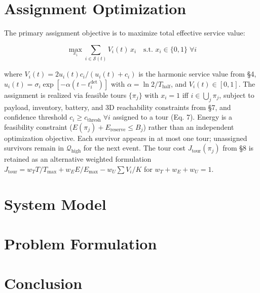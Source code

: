 \documentclass[conference]{IEEEtran}
\begin{document}
\section{Assignment Optimization}

The primary assignment objective is to maximize total effective service value:

\begin{equation}
\max_{x_i} \sum_{i\in\mathcal{S}(t)} V_i(t)\,x_i \quad \text{s.t. } x_i\in\{0,1\}\;\forall i
\end{equation}

where $V_i(t)=2u_i(t)c_i/(u_i(t)+c_i)$ is the harmonic service value from \S4, $u_i(t)=\sigma_i\exp[-\alpha(t-t_i^{\text{det}})]$ with $\alpha=\ln2/T_{\text{half}}$, and $V_i(t)\in[0,1]$. The assignment is realized via feasible tours $\{\pi_j\}$ with $x_i=1$ iff $i\in\bigcup_j\pi_j$, subject to payload, inventory, battery, and 3D reachability constraints from \S7, and confidence threshold $c_i\geq c_{\text{thresh}}\;\forall i$ assigned to a tour (Eq. 7). Energy is a feasibility constraint ($E(\pi_j)+E_{\text{reserve}}\leq B_j$) rather than an independent optimization objective. Each survivor appears in at most one tour; unassigned survivors remain in $\mathcal{Q}_{\text{high}}$ for the next event. The tour cost $J_{\text{tour}}(\pi_j)$ from \S8 is retained as an alternative weighted formulation $J_{\text{tour}}=w_TT/T_{\max}+w_EE/E_{\max}-w_U\sum V_i/K$ for $w_T+w_E+w_U=1$.

\section{System Model}


\section{Problem Formulation}


\section{Conclusion}

\end{document}
